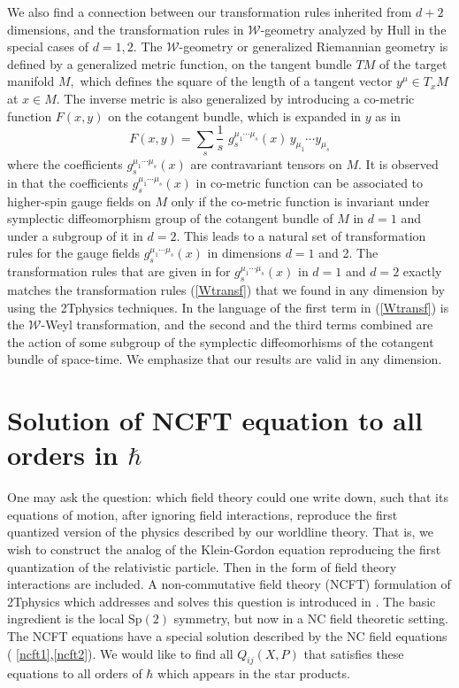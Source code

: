 \documentclass[a4paper,12pt]{article}
\begin{document}
We also find a connection between our transformation rules inherited from $%
d+2$ dimensions, and the transformation rules in $\mathcal{W}$-geometry
analyzed by Hull \cite{Hull} in the special cases of $d=1,2$. The $\mathcal{W%
}$-geometry or generalized Riemannian geometry is defined by a generalized
metric function, on the tangent bundle $TM$ of the target manifold $M,$
which defines the square of the length of a tangent vector $y^{\mu }\in
T_{x}M$ at $x\in M$. The inverse metric is also generalized by introducing a
co-metric function $F(x,y)$ on the cotangent bundle, which is expanded in $y$
as in \cite{Hull}
\begin{equation}
F(x,y)=\sum_{s}\frac{1}{s}\,\,g_{s}^{\mu _{1}\cdots \mu _{s}}(x)\,y_{\mu
_{1}}\cdots y_{\mu _{s}}
\end{equation}
where the coefficients $g_{s}^{\mu _{1}\cdots \mu _{s}}(x)$ are
contravariant tensors on $M$. It is observed in \cite{Hull} that the
coefficients $g_{s}^{\mu _{1}\cdots \mu _{s}}(x)$ in co-metric function can
be associated to higher-spin gauge fields on $M$ only if the co-metric
function is invariant under symplectic diffeomorphism group of the cotangent
bundle of $M$ in $d=1$ and under a subgroup of it in $d=2$. This leads to a
natural set of transformation rules for the gauge fields $g_{s}^{\mu
_{1}\cdots \mu _{s}}(x)$ in dimensions $d=1$ and 2. The transformation rules
that are given in \cite{Hull} for $g_{s}^{\mu _{1}\cdots \mu _{s}}(x)$ in $%
d=1$ and $d=2$ exactly matches the transformation rules (\ref{Wtransf}) that
we found in any dimension by using the 2Tphysics techniques. In the language
of \cite{Hull} the first term in (\ref{Wtransf}) is the $\mathcal{W}$-Weyl
transformation, and the second and the third terms combined are the action
of some subgroup of the symplectic diffeomorhisms of the cotangent bundle of
space-time. We emphasize that our results are valid in any dimension.

\section{Solution of NCFT equation to all orders in $\hbar $}

One may ask the question: which field theory could one write down, such that
its equations of motion, after ignoring field interactions, reproduce the
first quantized version of the physics described by our worldline theory.
That is, we wish to construct the analog of the Klein-Gordon equation
reproducing the first quantization of the relativistic particle. Then in the
form of field theory interactions are included. A non-commutative field
theory (NCFT) formulation of 2Tphysics which addresses and solves this
question is introduced in \cite{ncsp}. The basic ingredient is the local Sp$%
\left( 2\right) $ symmetry, but now in a NC field theoretic setting. The
NCFT equations have a special solution described by the NC field equations (%
\ref{ncft1},\ref{ncft2}). We would like to find all $Q_{ij}\left( X,P\right)
$ that satisfies these equations to all orders of $\hbar $ which appears in
the star products.
\end{document}
